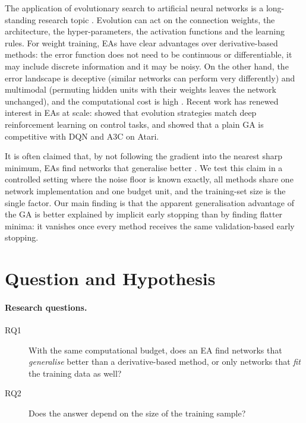 \documentclass[11pt]{article}
\begin{document}
The application of evolutionary search to artificial neural networks is a long-standing research topic
\citep{yao1999evolving}. Evolution can act on the connection weights, the architecture, the
hyper-parameters, the activation functions and the learning rules. For weight training, EAs have clear
advantages over derivative-based methods: the error function does not need to be continuous or
differentiable, it may include discrete information and it may be noisy. On the other hand, the error
landscape is deceptive (similar networks can perform very differently) and multimodal (permuting hidden
units with their weights leaves the network unchanged), and the computational cost is high
\citep{yao1999evolving}. Recent work has renewed interest in EAs at scale: \citet{salimans2017evolution}
showed that evolution strategies match deep reinforcement learning on control tasks, and
\citet{such2017deep} showed that a plain GA is competitive with DQN and A3C on Atari.

It is often claimed that, by not following the gradient into the nearest sharp minimum, EAs find
networks that generalise better \citep{keskar2017large}. We test this claim in a controlled setting
where the noise floor is known exactly, all methods share one network implementation and one budget
unit, and the training-set size is the single factor. Our main finding is that the apparent
generalisation advantage of the GA is better explained by implicit early stopping than by finding
flatter minima: it vanishes once every method receives the same validation-based early stopping.

\section{Question and Hypothesis}

\paragraph{Research questions.}
\begin{description}
  \item[RQ1] With the same computational budget, does an EA find networks that \emph{generalise} better
  than a derivative-based method, or only networks that \emph{fit} the training data as well?
  \item[RQ2] Does the answer depend on the size of the training sample?
\end{description}
\end{document}
